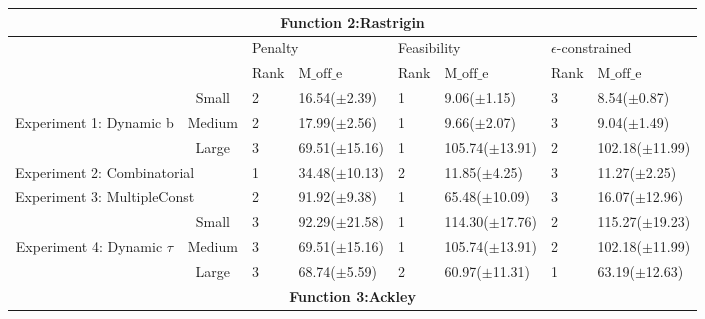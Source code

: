 \documentclass[review]{elsarticle}
\begin{document}
\begin{table*}[t]
{\begin{tabular}{cc|llllll}
\multicolumn{8}{c}{\textbf{Function 2:Rastrigin}}                                                                                                                                   \\\hline
                                  &        & \multicolumn{2}{l}{Penalty}   & \multicolumn{2}{l}{Feasibility} & \multicolumn{2}{l}{$\epsilon$-constrained}  \\
                                  &        & Rank & $\text{M\_off\_e}$ & Rank & $\text{M\_off\_e}$   & Rank & $\text{M\_off\_e}$                                \\\hline
                                  & Small  & 2    & 16.54($\pm$2.39)           & 1    & 9.06($\pm$1.15)              & 3    & 8.54($\pm$0.87)                                           \\
Experiment 1: Dynamic b                         & Medium & 2    & 17.99($\pm$2.56)           & 1    & 9.66($\pm$2.07)              & 3    & 9.04($\pm$1.49)                                           \\
                                  & Large  & 3    & 69.51($\pm$15.16)          & 1    & 105.74($\pm$13.91)           & 2    & 102.18($\pm$11.99)                                        \\
\multicolumn{2}{l|}{Experiment 2: Combinatorial}          & 1    & 34.48($\pm$10.13)          & 2    & 11.85($\pm$4.25)             & 3    & 11.27($\pm$2.25)                                          \\
\multicolumn{2}{l|}{Experiment 3: MultipleConst}          & 2    & 91.92($\pm$9.38)           & 1    & 65.48($\pm$10.09)            & 3    & 16.07($\pm$12.96)                                         \\
                                  & Small  & 3    & 92.29($\pm$21.58)          & 1    & 114.30($\pm$17.76)           & 2    & 115.27($\pm$19.23)                                        \\
Experiment 4: Dynamic $\tau$       & Medium & 3    & 69.51($\pm$15.16)          & 1    & 105.74($\pm$13.91)           & 2    & 102.18($\pm$11.99)                                        \\
                                  & Large  & 3    & 68.74($\pm$5.59)           & 2    & 60.97($\pm$11.31)            & 1    & 63.19($\pm$12.63)                                         \\\hline
\multicolumn{8}{c}{\textbf{Function 3:Ackley}}                                                                                                                                      \\\hline

\end{tabular}}
\end{table*}
\end{document}
